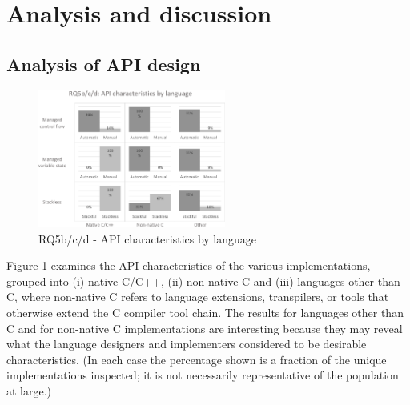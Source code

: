 \documentclass[format=acmsmall, review=false, screen=false]{acmart}
\begin{document}
\section{Analysis and discussion}
\label{section:analysis}

\subsection{Analysis of API design}
\label{analysis-of-api-design}

\begin{figure}[h]
	\includegraphics[width=0.55\textwidth]{RQ5b-c-d-API-characteristics-by-language}
	\caption{RQ5b/c/d - API characteristics by language}
	\label{fig:rq5bcd}
\end{figure}

%		

Figure \ref{fig:rq5bcd} examines the API characteristics of the various implementations, grouped into (i) native C/C++, (ii) non-native C and (iii) languages other than C, where non-native C refers to language extensions, transpilers, or tools that otherwise extend the C compiler tool chain. The results for languages other than C and for non-native C implementations are interesting because they may reveal what the language designers and implementers considered to be desirable characteristics. (In each case the percentage shown is a fraction of the unique implementations inspected; it is not necessarily representative of the population at large.)
\end{document}

